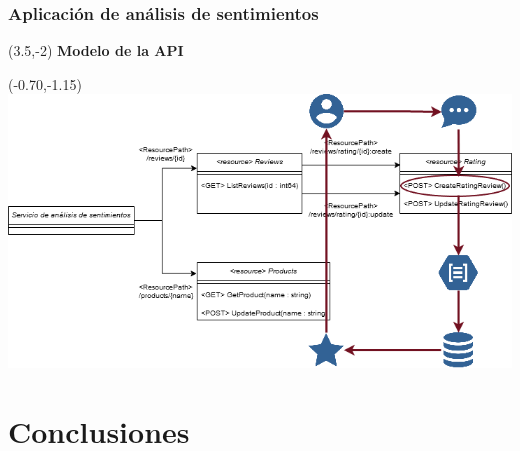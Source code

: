 \documentclass[10pt]{beamer}
\begin{document}
\begin{frame}
\frametitle{Aplicación de análisis de sentimientos}
\vspace{-1.5cm}
\begin{textblock}{15}(3.5,-2)
	\large{\textbf{\textcolor{pantone}{Modelo de la API}}}
\end{textblock}
\begin{textblock}{10.5}(-0.70,-1.15)
	\includegraphics[width = 1.15\textwidth]{Figuras/API2.png}
\end{textblock}
	
\end{frame}

\section{Conclusiones}
\end{document}
